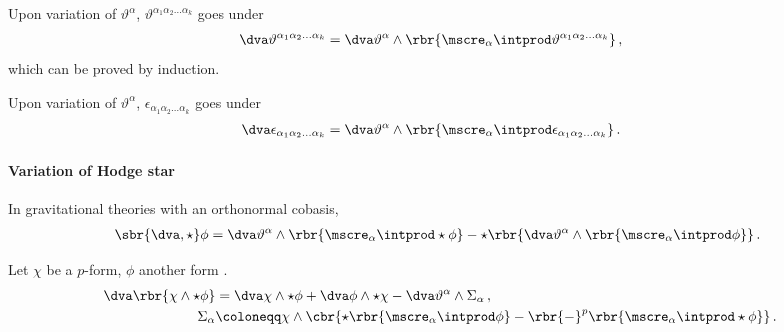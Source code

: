 \documentclass[a4paper]{article}
\begin{document}

Upon variation of $\vartheta^{\alpha}$, $\vartheta^{\alpha_{1}\alpha_{2}\ldots 
\alpha_{k}}$ goes under
\begin{align}
\dva \vartheta^{\alpha_{1}\alpha_{2}\ldots \alpha_{k}} &=
\dva \vartheta^{\alpha} \wedge \rbr{\mscre_{\alpha}\intprod 
	\vartheta^{\alpha_{1}\alpha_{2}\ldots \alpha_{k}}}\,,
\end{align}
which can be proved by induction.

Upon variation of $\vartheta^{\alpha}$, $\epsilon_{\alpha_{1}\alpha_{2}\ldots 
\alpha_{k}}$ goes under \cite[sec.\ A.2]{Muench1998}
\begin{align}
\dva \epsilon_{\alpha_{1}\alpha_{2}\ldots \alpha_{k}} &=
\dva \vartheta^{\alpha} \wedge \rbr{\mscre_{\alpha}\intprod 
	\epsilon_{\alpha_{1}\alpha_{2}\ldots \alpha_{k}}}\,.
\end{align}

\paragraph{Variation of Hodge star}
In gravitational theories \cite[sec.\ 3.2]{Muench1998} with an orthonormal 
cobasis,
\begin{align}
\sbr{\dva, \star}\phi = 
\dva\vartheta^{\alpha}\wedge\rbr{\mscre_{\alpha}\intprod\star\phi} -
\star\rbr{\dva\vartheta^{\alpha}\wedge\rbr{\mscre_{\alpha}\intprod\phi}}\,.
\end{align}

Let $\chi$ be a $p$-form, $\phi$ another form \cite[sec.\ 5]{Itin1999}.
\begin{align}\
\dva\rbr{\chi\wedge\star\phi} &=
\dva \chi \wedge \star \phi + \dva \phi \wedge \star \chi -
	\dva \vartheta^{\alpha} \wedge \Sigma_{\alpha}\,,
\\
\Sigma_{\alpha} &\coloneqq \chi \wedge \cbr{
	\star\rbr{\mscre_{\alpha}\intprod\phi} -
	\rbr{-}^{p} \rbr{\mscre_{\alpha}\intprod\star\phi}}\,.
\end{align}


\printbibliography
\end{document}
